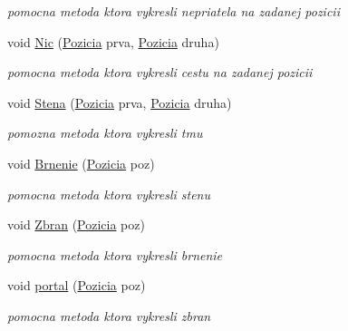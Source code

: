 \begin{DoxyCompactItemize}
\begin{DoxyCompactList}\small\item\em pomocna metoda ktora vykresli nepriatela na zadanej pozicii \end{DoxyCompactList}\item 
\hypertarget{class_kpole_a452b8134669f24dfe94ab933d5633fdb}{void \hyperlink{class_kpole_a452b8134669f24dfe94ab933d5633fdb}{Nic} (\hyperlink{struct_pozicia}{Pozicia} prva, \hyperlink{struct_pozicia}{Pozicia} druha)}\label{class_kpole_a452b8134669f24dfe94ab933d5633fdb}

\begin{DoxyCompactList}\small\item\em pomocna metoda ktora vykresli cestu na zadanej pozicii \end{DoxyCompactList}\item 
\hypertarget{class_kpole_ab513ed3e38adfc27226dcb364d11dbdc}{void \hyperlink{class_kpole_ab513ed3e38adfc27226dcb364d11dbdc}{Stena} (\hyperlink{struct_pozicia}{Pozicia} prva, \hyperlink{struct_pozicia}{Pozicia} druha)}\label{class_kpole_ab513ed3e38adfc27226dcb364d11dbdc}

\begin{DoxyCompactList}\small\item\em pomozna metoda ktora vykresli tmu \end{DoxyCompactList}\item 
\hypertarget{class_kpole_a2982cdfc9f891b35a1651ce62b2eec02}{void \hyperlink{class_kpole_a2982cdfc9f891b35a1651ce62b2eec02}{Brnenie} (\hyperlink{struct_pozicia}{Pozicia} poz)}\label{class_kpole_a2982cdfc9f891b35a1651ce62b2eec02}

\begin{DoxyCompactList}\small\item\em pomocna metoda ktora vykresli stenu \end{DoxyCompactList}\item 
\hypertarget{class_kpole_ab4987bb1f9bfe8e9721a18054a128bf6}{void \hyperlink{class_kpole_ab4987bb1f9bfe8e9721a18054a128bf6}{Zbran} (\hyperlink{struct_pozicia}{Pozicia} poz)}\label{class_kpole_ab4987bb1f9bfe8e9721a18054a128bf6}

\begin{DoxyCompactList}\small\item\em pomocna metoda ktora vykresli brnenie \end{DoxyCompactList}\item 
\hypertarget{class_kpole_aa668c2502a5a4ecdadeb7d7cbaf2fe1e}{void \hyperlink{class_kpole_aa668c2502a5a4ecdadeb7d7cbaf2fe1e}{portal} (\hyperlink{struct_pozicia}{Pozicia} poz)}\label{class_kpole_aa668c2502a5a4ecdadeb7d7cbaf2fe1e}

\begin{DoxyCompactList}\small\item\em pomocna metoda ktora vykresli zbran \end{DoxyCompactList}\end{DoxyCompactItemize}

